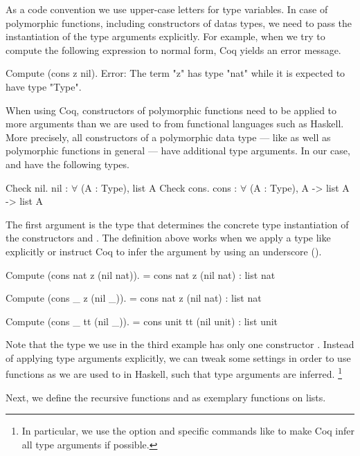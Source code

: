 As a code convention we use upper-case letters for type variables.
In case of polymorphic functions, including constructors of datas types, we need to pass the instantiation of the type arguments explicitly.
For example, when we try to compute the following expression to normal form, Coq yields an error message.

\begin{crepl}
\coqrepl Compute (cons z nil).
Error: The term "z" has type "nat" while it is expected to have type
       "Type".
\end{crepl}

When using Coq, constructors of polymorphic functions need to be applied to more arguments than we are used to from functional languages such as Haskell.
More precisely, all constructors of a polymorphic data type --- like  as well as polymorphic functions in general --- have additional type arguments.
In our case,  and  have the following types.

\begin{crepl}
\coqrepl Check nil.
   nil : \(\forall\) (A : Type), list A
\coqrepl Check cons.
   cons : \(\forall\) (A : Type), A -> list A -> list A
\end{crepl}

The first argument is the type that determines the concrete type instantiation of the constructors  and .
The definition above works when we apply a type like  explicitly or instruct Coq to infer the argument by using an underscore (\cinl{_}).

\begin{crepl}
\coqrepl Compute (cons nat z (nil nat)).
    = cons nat z (nil nat)
    : list nat

\coqrepl Compute (cons _ z (nil _)).
    = cons nat z (nil nat)
    : list nat

\coqrepl Compute (cons _ tt (nil _)).
    = cons unit tt (nil unit)
    : list unit
\end{crepl}

Note that the type  we use in the third example has only one constructor .
Instead of applying type arguments explicitly, we can tweak some settings in order to use functions as we are used to in Haskell, such that type arguments are inferred. \footnote{In particular, we use the option  and specific commands like  to make Coq infer all type arguments if possible.}

Next, we define the recursive functions  and  as exemplary functions on lists.

